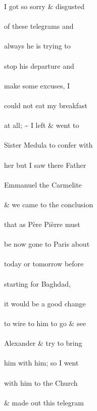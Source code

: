 \documentclass{report}
\begin{document}


	\par{
 	I got so sorry \& disgusted\ \\\ \\of these telegrams and\ \\\ \\always he is trying to\ \\\ \\stop his departure and\ \\\ \\make some excuses, I\ \\\ \\could not eat my breakfast\ \\\ \\at all; \~{} I left \& went to\ \\\ \\Sister Medula to confer with\ \\\ \\her but I saw there Father\ \\\ \\Emmanuel the Carmelite\ \\\ \\\& we came to the conclusion\ \\\ \\that as Père Pièrre must\ \\\ \\be now gone to Paris about\ \\\ \\today or tomorrow before\ \\\ \\starting for Baghdad,\ \\\ \\it would be a good change\ \\\ \\to wire to him to go \& see\ \\\ \\Alexander \& try to bring\ \\\ \\him with him; so I went\ \\\ \\with him to the Church\ \\\ \\\& made out this telegram\ \\\ \\
	}
\end{document}
